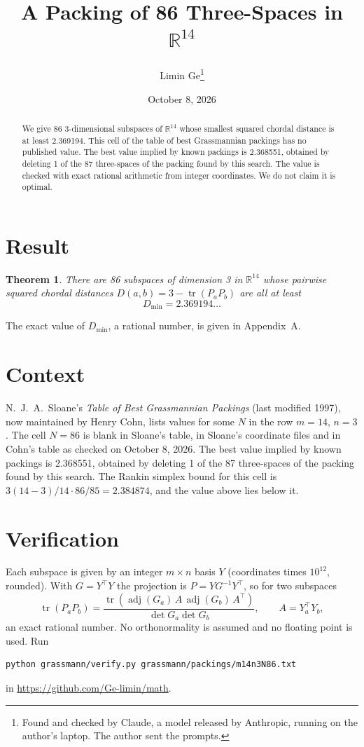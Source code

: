 \documentclass[11pt,a4paper]{article}
\title{A Packing of 86 Three-Spaces in $\mathbb{R}^{14}$}
\author{Limin Ge\thanks{Found and checked by Claude, a model released by Anthropic, running on the author's laptop. The author sent the prompts.}}
\date{October 8, 2026}
\newtheorem*{theorem}{Theorem}
\begin{document}
\maketitle
\begin{abstract}
We give 86 3-dimensional subspaces of $\mathbb{R}^{14}$ whose smallest squared chordal distance is at least 2.369194. This cell of the table of best Grassmannian packings has no published value. The best value implied by known packings is 2.368551, obtained by deleting 1 of the 87 three-spaces of the packing found by this search. The value is checked with exact rational arithmetic from integer coordinates. We do not claim it is optimal.
\end{abstract}

\section{Result}
\begin{theorem}
There are 86 subspaces of dimension 3 in $\mathbb{R}^{14}$ whose pairwise squared chordal distances $D(a,b) = 3 - \operatorname{tr}(P_aP_b)$ are all at least
\[ D_{\min} = 2.369194\ldots \]
\end{theorem}
The exact value of $D_{\min}$, a rational number, is given in Appendix~A.


\section{Context}
N.~J.~A.~Sloane's \emph{Table of Best Grassmannian Packings} (last modified 1997), now maintained by Henry Cohn, lists values for some $N$ in the row $m=14$, $n=3$. The cell $N=86$ is blank in Sloane's table, in Sloane's coordinate files and in Cohn's table as checked on October 8, 2026. The best value implied by known packings is 2.368551, obtained by deleting 1 of the 87 three-spaces of the packing found by this search. The Rankin simplex bound for this cell is $3(14-3)/14\cdot 86/85 = 2.384874$, and the value above lies below it.


\section{Verification}
Each subspace is given by an integer $m\times n$ basis $Y$ (coordinates times $10^{12}$, rounded). With $G=Y^\top Y$ the projection is $P=YG^{-1}Y^\top$, so for two subspaces
\[ \operatorname{tr}(P_aP_b)=\frac{\operatorname{tr}(\operatorname{adj}(G_a)\,A\,\operatorname{adj}(G_b)\,A^\top)}{\det G_a\det G_b},\qquad A=Y_a^\top Y_b, \]
an exact rational number. No orthonormality is assumed and no floating point is used. Run
\begin{verbatim}
python grassmann/verify.py grassmann/packings/m14n3N86.txt
\end{verbatim}
in \url{https://github.com/Ge-limin/math}.
\end{document}
